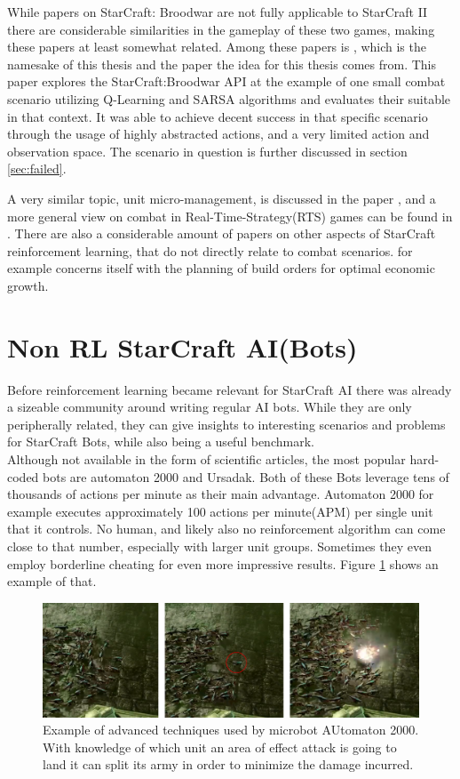 While papers on StarCraft: Broodwar are not fully applicable to StarCraft II there are considerable similarities in the gameplay of these two games, making these papers at least somewhat related. 
Among these papers is \citep{broodwarRL}, which is the namesake of this thesis and the paper the idea for this thesis comes from. This paper explores the StarCraft:Broodwar API at the example of one small combat scenario utilizing Q-Learning and SARSA algorithms and evaluates their suitable in that context. It was able to achieve decent success in that specific scenario through the usage of highly abstracted actions, and a very limited action and observation space. The scenario in question is further discussed in section \ref{sec:failed}.

A very similar topic, unit micro-management, is discussed in the paper \citep{scai:unitmicro}, and a more general view on combat in Real-Time-Strategy(RTS) games can be found in \citep{scai:gamecombat}. There are also a considerable amount of papers on other aspects of StarCraft reinforcement learning, that do not directly relate to combat scenarios. \citep{scai:bo} for example concerns itself with the planning of build orders for optimal economic growth.

\section{Non RL StarCraft AI(Bots)}
Before reinforcement learning became relevant for StarCraft AI there was already a sizeable community around writing regular AI bots. While they are only peripherally related, they can give insights to interesting scenarios and problems for StarCraft Bots, while also being a useful benchmark. \\Although not available in the form of scientific articles, the most popular hard-coded bots are automaton 2000 and Ursadak. Both of these Bots leverage tens of thousands of actions per minute as their main advantage. Automaton 2000 for example executes approximately 100 actions per minute(APM) per single unit that it controls. No human, and likely also no reinforcement algorithm can come close to that number, especially with larger unit groups. Sometimes they even employ borderline cheating for even more impressive results. Figure \ref{fig:aut} shows an example of that. 

\begin{figure}[htb]
  \centering
      \includegraphics[width=1\textwidth]{Figures/aut2000.png}
  \caption{ Example of advanced techniques used by microbot AUtomaton 2000. With knowledge of which unit an area of effect attack is going to land it can split its army in order to minimize the damage incurred.}
 \label{fig:aut}
\end{figure}

